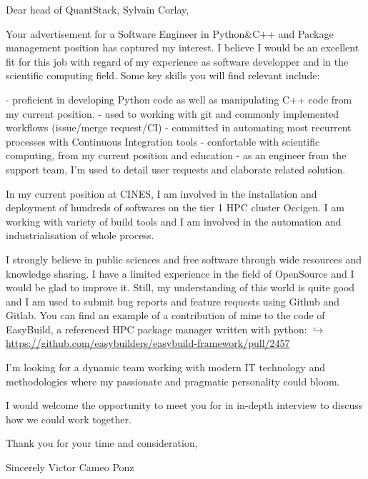 Dear head of QuantStack, Sylvain Corlay,

Your advertisement for a Software Engineer in Python\&C++ and Package
management position has captured my interest. I believe I would be an excellent
fit for this job with regard of my experience as software developper and in the
scientific computing field. Some key skills you will find relevant include:

 - proficient in developing Python code as well as manipulating C++ code from my
current position.
 - used to working with git and commonly implemented workflows (issue/merge
request/CI)
 - committed in automating most recurrent processes with Continuous Integration
tools
 - confortable with scientific computing, from my current position and education
 - as an engineer from the support team, I'm used to detail user requests and
elaborate related solution.


In my current position at CINES, I am involved in the installation and deployment
of hundreds of softwares on the tier 1 HPC cluster Occigen. I am working with
variety of build tools and I am involved in the automation and industrialisation
of whole process.

I strongly believe in public sciences and free software through wide resources and
knowledge sharing. I have a limited experience in the field of OpenSource and I
would be glad to improve it. Still, my understanding of this world is quite good
and I am used to submit bug reports and feature requests using Github and Gitlab.
You can find an example of a contribution of mine to the code of EasyBuild, a
referenced HPC package manager written with python:
\href{https://github.com/easybuilders/easybuild-framework/pull/2457}
{$\hookrightarrow$ https://github.com/easybuilders/easybuild-framework/pull/2457}

I'm looking for a dynamic team working with modern IT technology and
methodologies where my passionate and pragmatic personality could bloom.

I would welcome the opportunity to meet you for in in-depth interview to discuss
how we could work together.

Thank you for your time and consideration,

Sincerely
Victor Cameo Ponz



